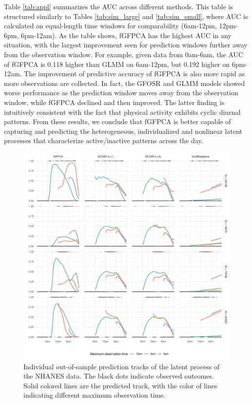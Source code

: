 \documentclass[12pt]{article}
\begin{document}
Table \ref{tab:appl} summarizes the AUC across different methods. This table is structured similarly to Tables \ref{tab:sim_large} and \ref{tab:sim_small}, where AUC is calculated on equal-length time windows for comparability (6am-12pm, 12pm-6pm, 6pm-12am). As the table shows, fGFPCA has the highest AUC in any situation, with the largest improvement seen for prediction windows further away from the observation window. For example, given data from 0am-6am, the AUC of fGFPCA is 0.118 higher than GLMM on 6am-12pm, but 0.192 higher on 6pm-12am. The improvement of predictive accuracy of fGFPCA is also more rapid as more observations are collected. In fact, the GFOSR and GLMM models showed worse performance as the prediction window moves away from the observation window, while fGFPCA declined and then improved. The latter finding is intuitively consistent with the fact that physical activity exhibits cyclic diurnal patterns. From these results, we conclude that fGFPCA is better capable of capturing and predicting the heterogeneous, individualized and nonlinear latent processes that characterize active/inactive patterns across the day. 


\begin{figure}
\centering
\includegraphics[width=\textwidth]{Figs/DataAppl.pdf}
\caption{Individual out-of-sample prediction tracks of the latent process of the NHANES data. The black dots indicate observed outcomes. Solid colored lines are the predicted track, with the color of lines indicating different maximum observation time. }
\label{fig:appl}
\end{figure}
\end{document}
